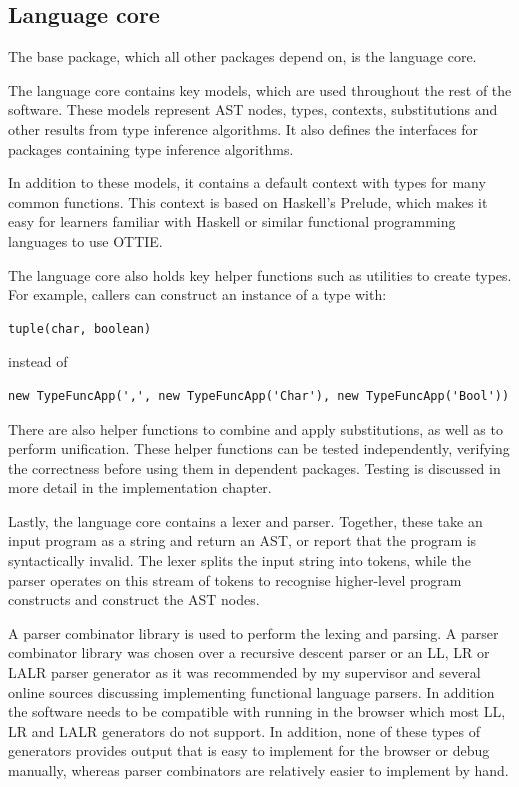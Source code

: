 \documentclass[a4paper,fleqn,oneside,12pt]{report}
\begin{document}
\subsection{Language core}\label{id:h.hggmfighusoc}

The base package, which all other packages depend on, is the language core.

The language core contains key models, which are used throughout the rest of the software. These models represent AST nodes, types, contexts, substitutions and other results from type inference algorithms. It also defines the interfaces for packages containing type inference algorithms.

In addition to these models, it contains a default context with types for many common functions. This context is based on Haskell's Prelude, which makes it easy for learners familiar with Haskell or similar functional programming languages to use OTTIE.

The language core also holds key helper functions such as utilities to create types. For example, callers can construct an instance of a type with:

\begin{verbatim}
tuple(char, boolean)
\end{verbatim}
instead of

\begin{verbatim}
new TypeFuncApp(',', new TypeFuncApp('Char'), new TypeFuncApp('Bool'))
\end{verbatim}
There are also helper functions to combine and apply substitutions, as well as to perform unification. These helper functions can be tested independently, verifying the correctness before using them in dependent packages. Testing is discussed in more detail in the implementation chapter.

Lastly, the language core contains a lexer and parser. Together, these take an input program as a string and return an AST, or report that the program is syntactically invalid. The lexer splits the input string into tokens, while the parser operates on this stream of tokens to recognise higher-level program constructs and construct the AST nodes.

A parser combinator library is used to perform the lexing and parsing. A parser combinator library was chosen over a recursive descent parser or an LL, LR or LALR parser generator as it was recommended by my supervisor and several online sources discussing implementing functional language parsers. In addition the software needs to be compatible with running in the browser which most LL, LR and LALR generators do not support. In addition, none of these types of generators provides output that is easy to implement for the browser or debug manually, whereas parser combinators are relatively easier to implement by hand.
\end{document}
